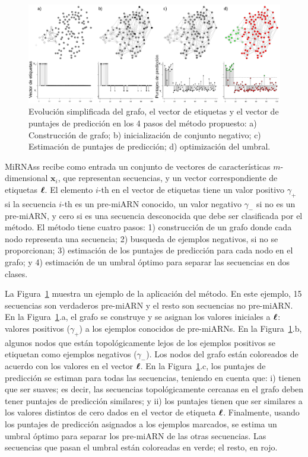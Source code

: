 \begin{figure}[tpb]
	\centering
	\includegraphics[width=\linewidth]{fig/workflow.eps}
	\caption[Evolución del grafo]{Evolución simplificada del grafo, el vector de etiquetas y el vector de puntajes de predicción en los 4 pasos del método
	propuesto: a) Construcción de grafo; b) inicialización de conjunto negativo; c) Estimación de puntajes de predicción; d) optimización del umbral.}
	\label{fig:workflow}
\end{figure}

MiRNAss recibe como entrada un conjunto de vectores de características $m$-dimensional $\mathbf{x}_{i}$, que representan secuencias, y un vector
correspondiente de etiquetas $\boldsymbol\ell$. El elemento $i$-th en el vector de etiquetas tiene un valor positivo $\gamma_{+}$ si la secuencia $i$-th es un pre-miARN
conocido, un valor negativo $\gamma_{-}$ si no es un pre-miARN, y cero si es una secuencia desconocida que debe ser clasificada por el método. El método
tiene cuatro pasos: 1) construcción de un grafo donde cada nodo representa una secuencia; 2) busqueda de ejemplos negativos, si no se proporcionan; 3) estimación
de los puntajes de predicción para cada nodo en el grafo; y 4) estimación de un umbral óptimo para separar las secuencias en dos clases.

La Figura~\ref{fig:workflow} muestra un ejemplo de la aplicación del método. En este ejemplo, 15 secuencias son verdaderos pre-miARN y el resto son secuencias
no pre-miARN. En la Figura~\ref{fig:workflow}.a, el grafo se construye y se asignan los valores iniciales a $\boldsymbol\ell$: valores positivos ($\gamma_{+}$) a los
ejemplos conocidos de pre-miARNs. En la Figura~\ref{fig:workflow}.b, algunos nodos que están topológicamente lejos de los ejemplos positivos se etiquetan como
ejemplos negativos ($\gamma_{-}$). Los nodos del grafo están coloreados de acuerdo con los valores en el vector $\boldsymbol\ell$. En la Figura~\ref{fig:workflow}.c,
los puntajes de predicción se estiman para todas las secuencias, teniendo en cuenta que: i) tienen que ser suaves; es decir, las secuencias topológicamente
cercanas en el grafo deben tener puntajes de predicción similares; y ii) los puntajes tienen que ser similares a los valores distintos de cero dados en el
vector de etiqueta $\boldsymbol\ell$. Finalmente, usando los puntajes de predicción asignados a los ejemplos marcados, se estima un umbral óptimo para separar los
pre-miARN de las otras secuencias. Las secuencias que pasan el umbral están coloreadas en verde; el resto, en rojo.

